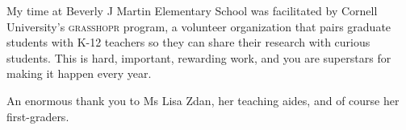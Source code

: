 \documentclass[sigplan,review]{acmart}
\begin{document}
My time at Beverly J Martin Elementary School was facilitated by Cornell University's \textsc{grasshopr} program, a volunteer organization that pairs graduate students with K-12 teachers so they can share their research with curious students.
This is hard, important, rewarding work, and you are superstars for making it happen every year.

An enormous thank you to Ms Lisa Zdan, her teaching aides, and of course her first-graders.

\appendix



\end{document}

